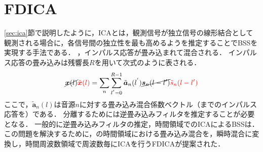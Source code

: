 \section{FDICA}
\label{sec:fdica}
\ref{sec:ica}節で説明したように，ICAとは，観測信号が独立信号の線形結合として観測される場合に，各信号間の独立性を最も高めるようを推定することでBSSを実現する手法である．
，インパルス応答が畳み込まれて混合される．
インパルス応答の畳み込みは残響長$R$を用いて次式のように表される．
\begin{align}
  \cancel{\bm{x}(l)}\textcolor{red}{\tilde{\bm{x}} (l)} = \sum_n \sum_{l^{'}=0}^{R-1} \tilde{\bm{a}}_n(l^{'}) \cancel{\bm{s}_n(l-l')} \textcolor{red}{\tilde{s}_n (l - l')}
  \label{f:tatami}
\end{align}
ここで，$\tilde{\bm{a}}_n(l)$は音源{$n$}に対する畳み込み混合係数ベクトル（までのインパルス応答を）である．
分離するためには逆畳み込みフィルタを推定することが必要となる．
一般的に逆畳み込みフィルタの推定，時間領域でのICAによるBSSは．
この問題を解決するために，の時間領域における畳み込み混合を，瞬時混合に変換し，時間周波数領域で周波数毎にICAを行うFDICAが提案された．

